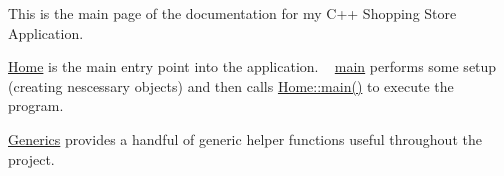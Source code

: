 This is the main page of the documentation for my C++ Shopping Store Application.

\mbox{\hyperlink{class_home_Home}{Home}} is the main entry point into the application. ~\newline
 \mbox{\hyperlink{main_8cpp_ae66f6b31b5ad750f1fe042a706a4e3d4}{main}} performs some setup (creating nescessary objects) and then calls \mbox{\hyperlink{class_home_af37e6f3e876567384e5bfe8a425cd7cd}{Home\+::main()}} to execute the program.

\mbox{\hyperlink{class_generics_Generics}{Generics}} provides a handful of generic helper functions useful throughout the project. 
